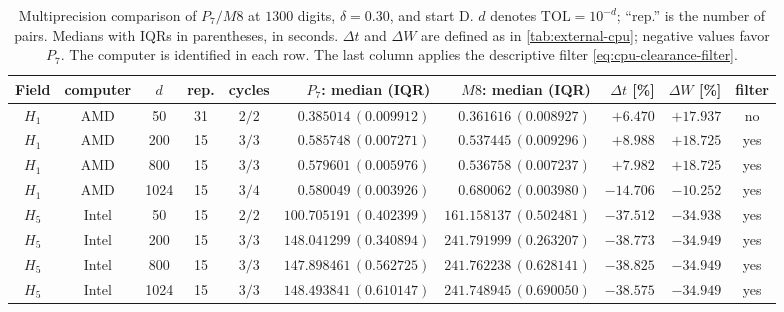 \begin{table}[htbp]
\centering\scriptsize
\setlength{\tabcolsep}{3pt}
\caption{Multiprecision comparison of $P_7/M8$ at $1300$ digits, $\delta=0.30$, and start D. $d$ denotes $\mathrm{TOL}=10^{-d}$; ``rep.'' is the number of pairs. Medians with IQRs in parentheses, in seconds. $\Delta t$ and $\Delta W$ are defined as in \cref{tab:external-cpu}; negative values favor $P_7$. The computer is identified in each row. The last column applies the descriptive filter \eqref{eq:cpu-clearance-filter}.}
\label{tab:mp-external8}
\begin{tabular}{cccccrrrrc}
\toprule
Field & computer & $d$ & rep. & cycles & $P_7$: median (IQR) & $M8$: median (IQR) & $\Delta t$ [\%] & $\Delta W$ [\%] & filter\\
\midrule
$H_{1}$ & AMD & 50 & 31 & $2/2$ & $0.385014\,(0.009912)$ & $0.361616\,(0.008927)$ & $+6.470$ & $+17.937$ & no\\
$H_{1}$ & AMD & 200 & 15 & $3/3$ & $0.585748\,(0.007271)$ & $0.537445\,(0.009296)$ & $+8.988$ & $+18.725$ & yes\\
$H_{1}$ & AMD & 800 & 15 & $3/3$ & $0.579601\,(0.005976)$ & $0.536758\,(0.007237)$ & $+7.982$ & $+18.725$ & yes\\
$H_{1}$ & AMD & 1024 & 15 & $3/4$ & $0.580049\,(0.003926)$ & $0.680062\,(0.003980)$ & $-14.706$ & $-10.252$ & yes\\
\midrule
$H_{5}$ & Intel & 50 & 15 & $2/2$ & $100.705191\,(0.402399)$ & $161.158137\,(0.502481)$ & $-37.512$ & $-34.938$ & yes\\
$H_{5}$ & Intel & 200 & 15 & $3/3$ & $148.041299\,(0.340894)$ & $241.791999\,(0.263207)$ & $-38.773$ & $-34.949$ & yes\\
$H_{5}$ & Intel & 800 & 15 & $3/3$ & $147.898461\,(0.562725)$ & $241.762238\,(0.628141)$ & $-38.825$ & $-34.949$ & yes\\
$H_{5}$ & Intel & 1024 & 15 & $3/3$ & $148.493841\,(0.610147)$ & $241.748945\,(0.690050)$ & $-38.575$ & $-34.949$ & yes\\
\bottomrule
\end{tabular}
\end{table}
